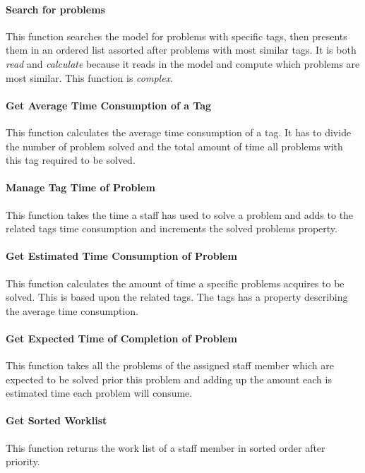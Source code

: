 \paragraph{Search for problems }
This function searches the model for problems with specific tags, then presents them in an ordered list assorted after problems with most similar tags. 
It is both \textit{read} and \textit{calculate} because it reads in the model and compute which problems are most similar. 
This function is \textit{complex}.

\paragraph{Get Average Time Consumption of a Tag }
This function calculates the average time consumption of a tag. 
It has to divide the number of problem solved and the total amount of time all problems with this tag required to be solved. 

\paragraph{Manage Tag Time of Problem }
This function takes the time a staff has used to solve a problem and adds to the related tags time consumption and increments the solved problems property. 

\paragraph{Get Estimated Time Consumption of Problem }
This function calculates the amount of time a specific problems acquires to be solved. This is based upon the related tags. 
The tags has a property describing the average time consumption.  

\paragraph{Get Expected Time of Completion of Problem}
This function takes all the problems of the assigned staff member which are expected to be solved prior this problem and adding up the amount each is estimated time each problem will consume.

\paragraph{Get Sorted Worklist}
This function returns the work list of a staff member in sorted order after priority. 


